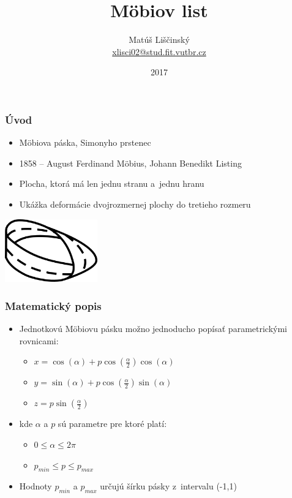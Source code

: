 \documentclass{beamer}
\title{Möbiov list}
\author{Matúš Liščinský \\ 
\small{\url{xlisci02@stud.fit.vutbr.cz}}}
\institute{Vysoké učení technické v~Brně \\
Fakulta informačních technologií}
\date{2017}
\begin{document}
\frame{\titlepage}
 
\begin{frame}
\frametitle{Úvod}
\begin{itemize}
\item Möbiova páska, Simonyho prstenec
\item 1858 -- August Ferdinand Möbius, Johann Benedikt Listing
\item Plocha, ktorá má len jednu stranu a~jednu hranu
\item Ukážka deformácie dvojrozmernej plochy do tretieho rozmeru
\end{itemize}
\centering
\vspace*{0.5cm}
\includegraphics[width=4cm]{paska.png}
\end{frame}

\begin{frame}
\frametitle{Matematický popis}
\begin{itemize}
\item Jednotkovú Möbiovu pásku možno jednoducho popísať parametrickými rovnicami:
\begin{itemize}
\item $x = \cos(\alpha) + p \cos(\frac{\alpha}{2}) \cos(\alpha) $
\item $y = \sin(\alpha) + p \cos(\frac{\alpha}{2}) \sin(\alpha) $
\item $z = p \sin(\frac{\alpha}{2}) $
\end{itemize}
\item[] kde $\alpha$ a $p$ sú parametre pre ktoré platí:
\begin{itemize}
\item $0 \leq \alpha \leq 2\pi$
\item $p_{min} \leq p \leq p_{max}$
\end{itemize}
\item Hodnoty $p_{min}$ a $p_{max}$ určujú šírku pásky z~intervalu (-1,1)
\end{itemize}

\end{frame} 
\end{document}
